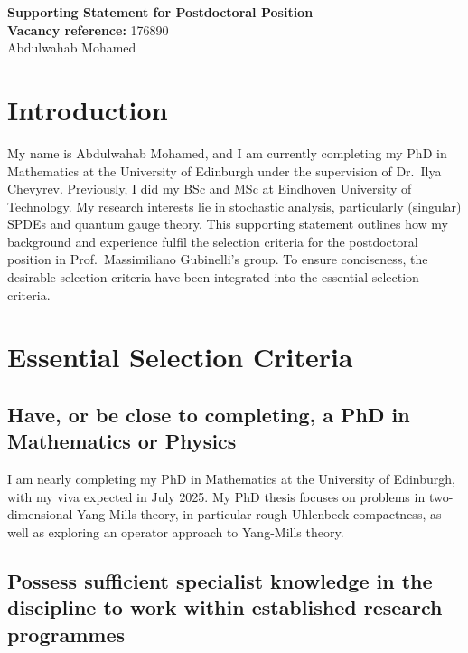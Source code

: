 \documentclass[12pt]{article}
\numberwithin{equation}{section}
\theoremstyle{definition}
\theoremstyle{remark}
\newcommand{\1}{\mathbf 1}
\newcommand{\<}{\langle}
\renewcommand{\>}{\rangle}
\begin{document}
\vspace{-10pt}
\begin{center}
    {\Large \textbf{Supporting Statement for Postdoctoral Position}} \\ \vspace{1pt}
    \textbf{Vacancy reference:} 176890\\
      Abdulwahab Mohamed \vspace{-0.5cm}
\end{center}

\section{Introduction}
My name is Abdulwahab Mohamed, and I am currently completing my PhD in Mathematics at the University of Edinburgh under the supervision of Dr.\ Ilya Chevyrev. Previously, I did my BSc and MSc at Eindhoven University of Technology. My research interests lie in stochastic analysis, particularly (singular) SPDEs and quantum gauge theory. 
This supporting statement outlines how my background and experience fulfil the selection criteria for the postdoctoral position in Prof.\ Massimiliano Gubinelli's group. To ensure conciseness, the desirable selection criteria have been integrated into the essential selection criteria.

\section{Essential Selection Criteria}
\subsection{Have, or be close to completing, a PhD in Mathematics or Physics}
I am nearly completing my PhD in Mathematics at the University of Edinburgh, with my viva expected in July 2025. My PhD thesis focuses on problems in two-dimensional Yang-Mills theory, in particular rough Uhlenbeck compactness, as well as exploring an operator approach to Yang-Mills theory.

\subsection{Possess sufficient specialist knowledge in the discipline to work within established research programmes}
\end{document}
